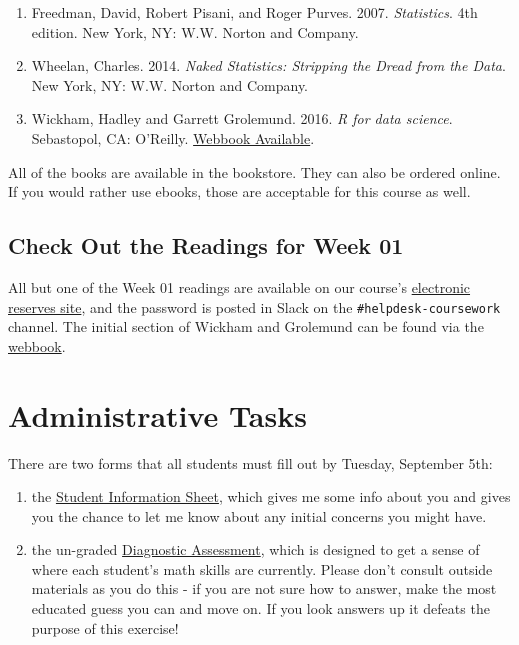 \documentclass[]{book}
\theoremstyle{definition}
\theoremstyle{definition}
\theoremstyle{definition}
\theoremstyle{remark}
\begin{document}
\begin{enumerate}
\def\labelenumi{\arabic{enumi}.}
\item
  Freedman, David, Robert Pisani, and Roger Purves. 2007.
  \emph{Statistics}. 4th edition. New York, NY: W.W. Norton and Company.
\item
  Wheelan, Charles. 2014. \emph{Naked Statistics: Stripping the Dread
  from the Data}. New York, NY: W.W. Norton and Company.
\item
  Wickham, Hadley and Garrett Grolemund. 2016. \emph{R for data
  science}. Sebastopol, CA: O'Reilly.
  \href{http://r4ds.had.co.nz}{Webbook Available}.
\end{enumerate}

All of the books are available in the bookstore. They can also be
ordered online. If you would rather use ebooks, those are acceptable for
this course as well.

\subsection{Check Out the Readings for Week
01}\label{check-out-the-readings-for-week-01}

All but one of the Week 01 readings are available on our course's
\href{http://eres.slu.edu/eres/coursepass.aspx?cid=4487}{electronic
reserves site}, and the password is posted in Slack on the
\texttt{\#helpdesk-coursework} channel. The initial section of Wickham
and Grolemund can be found via the
\href{http://r4ds.had.co.nz}{webbook}.

\section{Administrative Tasks}\label{administrative-tasks}

There are two forms that all students must fill out by Tuesday,
September 5th:

\begin{enumerate}
\def\labelenumi{\arabic{enumi}.}
\item
  the \href{https://goo.gl/forms/HddqLWd00qz6Qs903}{Student Information
  Sheet}, which gives me some info about you and gives you the chance to
  let me know about any initial concerns you might have.
\item
  the un-graded \href{https://goo.gl/forms/EgVGaUWu8mys2yBr2}{Diagnostic
  Assessment}, which is designed to get a sense of where each student's
  math skills are currently. Please don't consult outside materials as
  you do this - if you are not sure how to answer, make the most
  educated guess you can and move on. If you look answers up it defeats
  the purpose of this exercise!
\end{enumerate}
\end{document}
